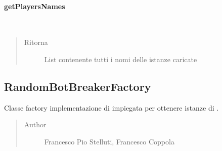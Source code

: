 \documentclass[letterpaper,10pt,italian,openany,oneside]{sphinxmanual}
\begin{document}
\paragraph{getPlayersNames}
\label{\detokenize{test/it/unicam/cs/pa/mastermind/factories/PlayerFactoryRegistry:getplayersnames}}

\begin{fulllineitems}
\label{\detokenize{test/it/unicam/cs/pa/mastermind/factories/PlayerFactoryRegistry:it.unicam.cs.pa.mastermind.factories.PlayerFactoryRegistry.getPlayersNames()}}~\begin{quote}\begin{description}
\item[{Ritorna}] \leavevmode
List contenente tutti i nomi delle istanze  caricate

\end{description}\end{quote}

\end{fulllineitems}



\subsection{RandomBotBreakerFactory}
\label{\detokenize{test/it/unicam/cs/pa/mastermind/factories/RandomBotBreakerFactory:randombotbreakerfactory}}\label{\detokenize{test/it/unicam/cs/pa/mastermind/factories/RandomBotBreakerFactory::doc}}

\begin{fulllineitems}
\label{\detokenize{test/it/unicam/cs/pa/mastermind/factories/RandomBotBreakerFactory:it.unicam.cs.pa.mastermind.factories.RandomBotBreakerFactory}}
Classe factory implementazione di  impiegata per ottenere istanze di .
\begin{quote}\begin{description}
\item[{Author}] \leavevmode
Francesco Pio Stelluti, Francesco Coppola

\end{description}\end{quote}

\end{fulllineitems}
\end{document}
